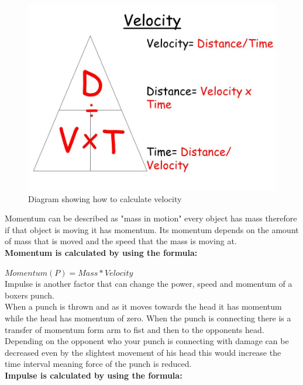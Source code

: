 \documentclass[a4paper,12pt]{report}
\begin{document}
 \begin{figure}[h]
    \begin{center}
    \includegraphics[scale=.3]{images/Velocity.jpeg}
    \caption{Diagram showing how to calculate velocity}
    \label{fig:velocity}
    \end{center}
\end{figure}

Momentum can be described as "mass in motion" every object has mass therefore if that object is moving it has momentum. Its momentum depends on the amount of mass that is moved and the speed that the mass is moving at.\\

\textbf{Momentum is calculated by using the formula:}

$Momentum (P) = Mass * Velocity$\\

Impulse is another factor that can change the power, speed and momentum of a boxers punch. \\
When a punch is thrown and as it moves towards the head it has momentum while the head has momentum of zero.
When the punch is connecting there is a transfer of momentum form arm to fist and then to the opponents head. \\
Depending on the opponent who your punch is connecting with damage can be decreased even by the slightest movement of his head this would increase the time interval meaning force of the punch is reduced. \\

\textbf{Impulse is calculated by using the formula:}
\end{document}
